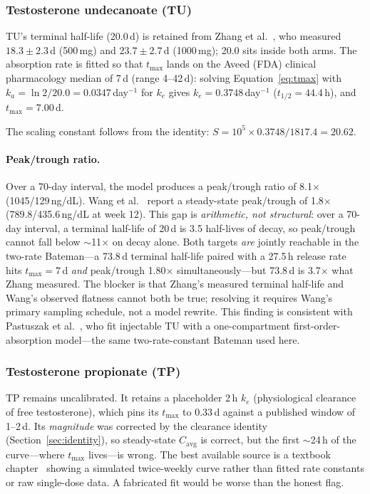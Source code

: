 \documentclass[11pt,a4paper]{article}
\begin{document}
\subsubsection{Testosterone undecanoate (TU)}

TU's terminal half-life (20.0\,d) is retained from Zhang et
al.~\cite{zhang1998}, who measured $18.3 \pm 2.3$\,d (500\,mg) and
$23.7 \pm 2.7$\,d (1000\,mg); 20.0 sits inside both arms. The absorption
rate is fitted so that $t_{\max}$ lands on the Aveed (FDA) clinical
pharmacology median of 7\,d (range 4--42\,d): solving
Equation~\ref{eq:tmax} with $k_a = \ln 2 / 20.0 = 0.0347$\,day$^{-1}$
for $k_e$ gives $k_e = 0.3748$\,day$^{-1}$ ($t_{1/2} = 44.4$\,h), and
$t_{\max} = 7.00$\,d.

The scaling constant follows from the identity:
$S = 10^5 \times 0.3748 / 1817.4 = 20.62$.

\paragraph{Peak/trough ratio.} Over a 70-day interval, the model
produces a peak/trough ratio of 8.1$\times$ (1045/129\,ng/dL). Wang et
al.~\cite{wang2010} report a steady-state peak/trough of 1.8$\times$
(789.8/435.6\,ng/dL at week 12). This gap is \emph{arithmetic, not
structural}: over a 70-day interval, a terminal half-life of 20\,d is
3.5 half-lives of decay, so peak/trough cannot fall below $\sim$11$\times$
on decay alone. Both targets \emph{are} jointly reachable in the
two-rate Bateman---a 73.8\,d terminal half-life paired with a 27.5\,h
release rate hits $t_{\max} = 7$\,d \emph{and} peak/trough 1.80$\times$
simultaneously---but 73.8\,d is 3.7$\times$ what Zhang measured. The
blocker is that Zhang's measured terminal half-life and Wang's observed
flatness cannot both be true; resolving it requires Wang's primary
sampling schedule, not a model rewrite. This finding is consistent with
Pastuszak et al.~\cite{pastuszak2021}, who fit injectable TU with a
one-compartment first-order-absorption model---the same two-rate-constant
Bateman used here.

\subsubsection{Testosterone propionate (TP)}

TP remains uncalibrated. It retains a placeholder 2\,h $k_e$
(physiological clearance of free testosterone), which pins its
$t_{\max}$ to 0.33\,d against a published window of 1--2\,d. Its
\emph{magnitude} was corrected by the clearance identity
(Section~\ref{sec:identity}), so steady-state $C_{\mathrm{avg}}$ is
correct, but the first $\sim$24\,h of the curve---where $t_{\max}$
lives---is wrong. The best available source is a textbook
chapter~\cite{behre2004} showing a simulated twice-weekly curve rather
than fitted rate constants or raw single-dose data. A fabricated fit
would be worse than the honest flag.
\end{document}
